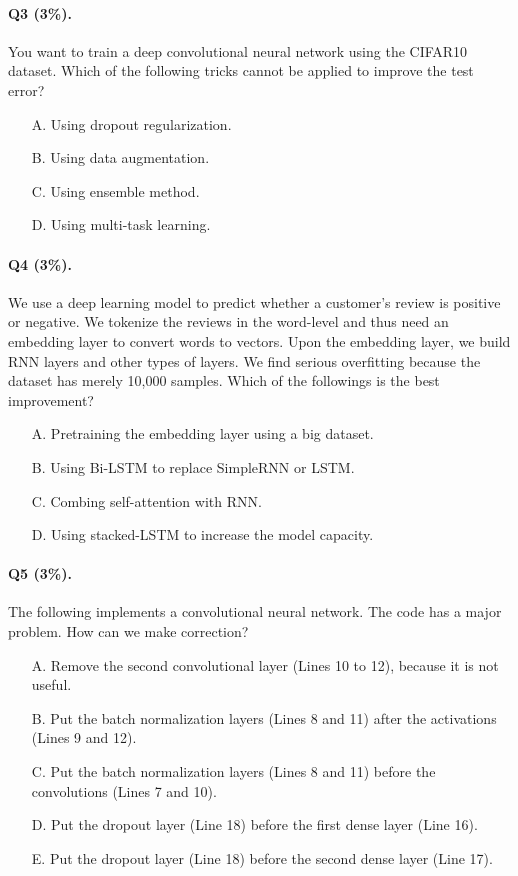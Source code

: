 \documentclass[11pt]{article}
\numberwithin{equation}{section}
\begin{document}
\paragraph{Q3 (3\%).} 
You want to train a deep convolutional neural network using the CIFAR10 dataset.
Which of the following tricks cannot be applied to improve the test error?
\begin{itemize}
	\item[A.]
	Using dropout regularization.
	\item[B.]
	Using data augmentation.
	\item[C.]
	Using ensemble method.
	\item[D.]
	Using multi-task learning.
\end{itemize}



\paragraph{Q4 (3\%).} 
We use a deep learning model to predict whether a customer's review is positive or negative.
We tokenize the reviews in the word-level and thus need an embedding layer to convert words to vectors.
Upon the embedding layer, we build RNN layers and other types of layers.
We find serious overfitting because the dataset has merely 10,000 samples.
Which of the followings is the best improvement?
\begin{itemize}
	\item[A.]
	Pretraining the embedding layer using a big dataset.
	\item[B.]
	Using Bi-LSTM to replace SimpleRNN or LSTM.
	\item[C.]
	Combing self-attention with RNN.
	\item[D.]
	Using stacked-LSTM to increase the model capacity.
\end{itemize}




\paragraph{Q5 (3\%).} 
The following implements a convolutional neural network.
The code has a major problem.
How can we make correction?
\begin{itemize}
	\item[A.]
	Remove the second convolutional layer (Lines 10 to 12), because it is not useful.
	\item[B.]
	Put the batch normalization layers (Lines 8 and 11) after the activations (Lines 9 and 12).
	\item[C.]
	Put the batch normalization layers (Lines 8 and 11) before the convolutions (Lines 7 and 10).
	\item[D.]
	Put the dropout layer (Line 18) before the first dense layer (Line 16).
	\item[E.]
	Put the dropout layer (Line 18) before the second dense layer (Line 17).
\end{itemize}
\end{document}
